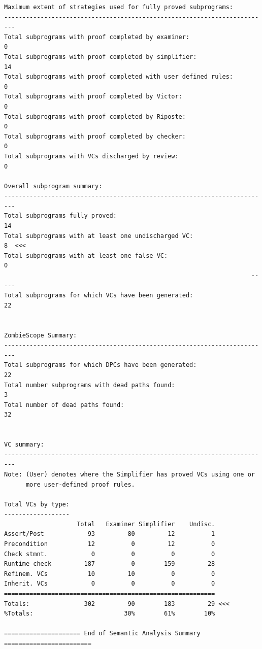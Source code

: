 \begin{lstlisting}[frame=single, gobble=0, caption={Summary of POGS report for PCA Pump prototype}, label={listing:pca_ravenscar:pogs}]
Maximum extent of strategies used for fully proved subprograms:
-------------------------------------------------------------------------
Total subprograms with proof completed by examiner:                     0
Total subprograms with proof completed by simplifier:                  14
Total subprograms with proof completed with user defined rules:         0
Total subprograms with proof completed by Victor:                       0
Total subprograms with proof completed by Riposte:                      0
Total subprograms with proof completed by checker:                      0
Total subprograms with VCs discharged by review:                        0

Overall subprogram summary:
-------------------------------------------------------------------------
Total subprograms fully proved:                                        14
Total subprograms with at least one undischarged VC:                    8  <<<
Total subprograms with at least one false VC:                           0
                                                                    -----
Total subprograms for which VCs have been generated:                   22


ZombieScope Summary:
-------------------------------------------------------------------------
Total subprograms for which DPCs have been generated:                  22
Total number subprograms with dead paths found:                         3
Total number of dead paths found:                                      32


VC summary:
-------------------------------------------------------------------------
Note: (User) denotes where the Simplifier has proved VCs using one or
      more user-defined proof rules.

Total VCs by type:
------------------
                    Total   Examiner Simplifier    Undisc.
Assert/Post            93         80         12          1
Precondition           12          0         12          0
Check stmnt.            0          0          0          0
Runtime check         187          0        159         28
Refinem. VCs           10         10          0          0
Inherit. VCs            0          0          0          0
==========================================================
Totals:               302         90        183         29 <<<
%Totals:                         30%        61%        10%

===================== End of Semantic Analysis Summary ========================
\end{lstlisting}
\doublespacing



